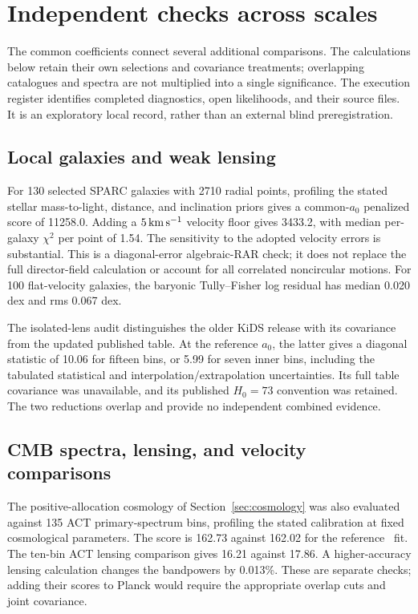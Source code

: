 \section{Independent checks across scales}

The common coefficients connect several additional comparisons. The
calculations below retain their own selections and covariance treatments;
overlapping catalogues and spectra are not multiplied into a single
significance. The execution register identifies completed diagnostics,
open likelihoods, and their source files. It is an exploratory local
record, rather than an external blind preregistration. 

\subsection{Local galaxies and weak lensing}
For 130 selected SPARC galaxies with 2710 radial points, profiling the
stated stellar mass-to-light, distance, and inclination priors gives a
common-$a_0$ penalized score of 11258.0. Adding a
$5\,\mathrm{km\,s^{-1}}$ velocity floor gives 3433.2, with median per-galaxy
$\chi^2$ per point of 1.54. The sensitivity to the adopted velocity
errors is substantial. This is a diagonal-error algebraic-RAR check;
it does not replace the full director-field calculation or account for
all correlated noncircular motions. For 100 flat-velocity galaxies,
the baryonic Tully--Fisher log residual has median 0.020 dex and rms
0.067 dex. 

The isolated-lens audit distinguishes the older KiDS release with its
covariance from the updated published table. At the reference $a_0$,
the latter gives a diagonal statistic of 10.06 for fifteen bins, or
5.99 for seven inner bins, including the tabulated statistical and
interpolation/extrapolation uncertainties. Its full table covariance
was unavailable, and its published $H_0=73$ convention was retained.
The two reductions overlap and provide no independent combined evidence.

\subsection{CMB spectra, lensing, and velocity comparisons}
The positive-allocation cosmology of Section~\ref{sec:cosmology} was
also evaluated against 135 ACT primary-spectrum bins, profiling the
stated calibration at fixed cosmological parameters. The score is
162.73 against 162.02 for the reference \LCDM\ fit. The ten-bin ACT
lensing comparison gives 16.21 against 17.86. A higher-accuracy
lensing calculation changes the bandpowers by 0.013\%. These are
separate checks; adding their scores to Planck would require the
appropriate overlap cuts and joint covariance. 

